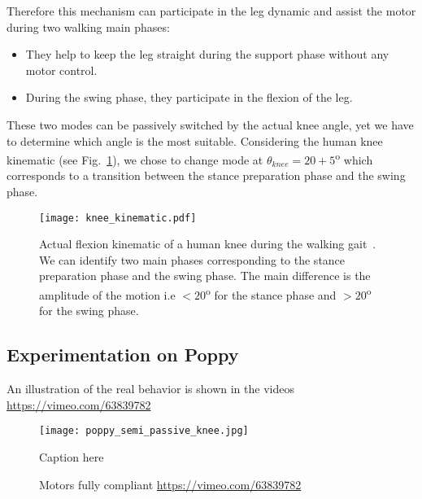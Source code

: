Therefore this mechanism can participate in the leg dynamic and assist the motor during two walking main phases:
\begin{itemize}
    \item They help to keep the leg straight during the support phase without any motor control.
    \item During the swing phase, they participate in the flexion of the leg.
\end{itemize}

These two modes can be passively switched by the actual knee angle, yet we have to determine which angle is the most suitable. Considering the human knee kinematic (see Fig.~\ref{fig:human_knee_kinematic}), we chose to change mode at $\theta_{knee} = 20+5$\textsuperscript{o}  which corresponds to a transition between the stance preparation phase and the swing phase.

\begin{figure}[thpb]
    \centering
    \texttt{[image: knee\_kinematic.pdf]}
    \caption{Actual flexion kinematic of a human knee during the walking gait~\cite{Nester2003}. We can identify two main phases corresponding to the stance preparation phase and the swing phase. The main difference is the amplitude of the motion i.e $<20$\textsuperscript{o}  for the stance phase and $>20$\textsuperscript{o} for the swing phase.}
    \label{fig:human_knee_kinematic}
\end{figure}


\subsection{Experimentation on Poppy} %

An illustration of the real behavior is shown in the videos \url{https://vimeo.com/63839782}

\begin{figure}[h]
    \begin{center}
        \texttt{[image: poppy\_semi\_passive\_knee.jpg]}
    \end{center}
    \caption{Caption here}
    \label{fig:figure1}
\end{figure}


\begin{figure}[!h]
\centering
    \hfil
    \caption{Motors fully compliant \url{https://vimeo.com/63839782}}
    \label{fig:}
\end{figure}




